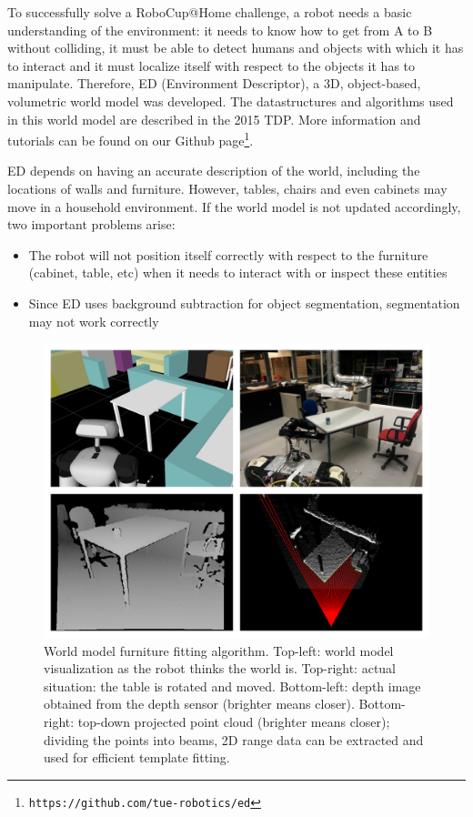 To successfully solve a RoboCup@Home challenge, a robot needs a basic understanding of the environment: it needs to know how to get from A to B without colliding, it must be able to detect humans and objects with which it has to interact and it must localize itself with respect to the objects it has to manipulate. Therefore, ED (Environment Descriptor), a 3D, object-based, volumetric world model was developed. The datastructures and algorithms used in this world model are described in the 2015 TDP. More information and tutorials can be found on our Github page\footnote{\texttt{https://github.com/tue-robotics/ed}}.

ED depends on having an accurate description of the world, including the locations of walls and furniture. However, tables, chairs and even cabinets may move in a household environment. If the world model is not updated accordingly, two important problems arise:

\begin{itemize}
    \item The robot will not position itself correctly with respect to the furniture (cabinet, table, etc) when it needs to interact with or inspect these entities
    \item Since ED uses background subtraction for object segmentation, segmentation may not work correctly
\end{itemize}

\begin{figure}[ht]
        \includegraphics[width = \linewidth]{Figures/fitting}
        \caption{World model furniture fitting algorithm. Top-left: world model visualization as the robot thinks the world is. Top-right: actual situation: the table is rotated and moved. Bottom-left: depth image obtained from the depth sensor (brighter means closer). Bottom-right: top-down projected point cloud (brighter means closer); dividing the points into beams, 2D range data can be extracted and used for efficient template fitting.}
        \label{fig:fitting}
\end{figure}

